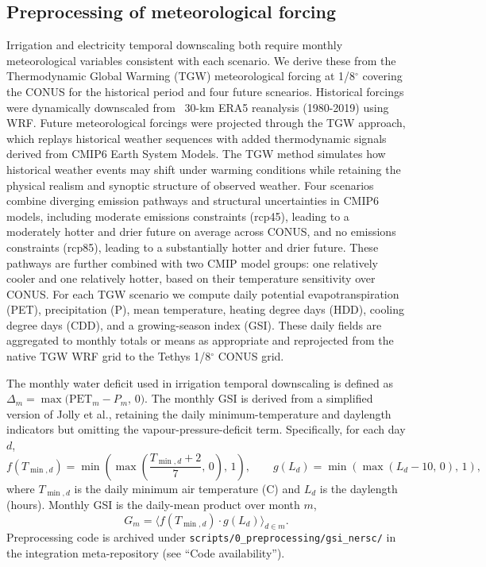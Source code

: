 \documentclass[fleqn,10pt]{wlscirep}
\begin{document}
\subsection*{Preprocessing of meteorological forcing}

Irrigation and electricity temporal downscaling both require monthly meteorological variables consistent with each scenario. We derive these from the Thermodynamic Global Warming (TGW) meteorological forcing \cite{Jones2023TGW}at 1/8$^{\circ}$ covering the CONUS for the historical period and four future scnearios. Historical forcings were dynamically downscaled from ~30-km ERA5 reanalysis (1980-2019) using WRF. Future meteorological forcings were projected through the TGW approach, which replays historical weather sequences with added thermodynamic signals derived from CMIP6 Earth System Models. The TGW method simulates how historical weather events may shift under warming conditions while retaining the physical realism and synoptic structure of observed weather. Four scenarios combine diverging emission pathways and structural uncertainties in CMIP6 models, including moderate emissions constraints (rcp45), leading to a moderately hotter and drier future on average across CONUS, and no emissions constraints (rcp85), leading to a substantially hotter and drier future. These pathways are further combined with two CMIP model groups: one relatively cooler and one relatively hotter, based on their temperature sensitivity over CONUS. For each TGW scenario we compute daily potential evapotranspiration (PET), precipitation (P), mean temperature, heating degree days (HDD), cooling degree days (CDD), and a growing-season index (GSI). These daily fields are aggregated to monthly totals or means as appropriate and reprojected from the native TGW WRF grid to the Tethys 1/8$^{\circ}$ CONUS grid.

The monthly water deficit used in irrigation temporal downscaling is defined as $\Delta_m = \max\!\big(\text{PET}_m - P_m,\, 0\big)$. The monthly GSI is derived from a simplified version of Jolly et al.\cite{Jolly_2005}, retaining the daily minimum-temperature and daylength indicators but omitting the vapour-pressure-deficit term. Specifically, for each day $d$,
\begin{equation}
f(T_{\min,d}) = \min\!\left(\max\!\left(\frac{T_{\min,d}+2}{7},\,0\right),\,1\right), \qquad
g(L_d) = \min\!\left(\max\!\left(L_d - 10,\,0\right),\,1\right),
\label{eq:gsi-components}
\end{equation}
where $T_{\min,d}$ is the daily minimum air temperature (\textdegree C) and $L_d$ is the daylength (hours). Monthly GSI is the daily-mean product over month $m$,
\begin{equation}
G_m = \big\langle f(T_{\min,d}) \cdot g(L_d) \big\rangle_{d \in m}.
\label{eq:gsi-monthly}
\end{equation}
Preprocessing code is archived under \texttt{scripts/0\_preprocessing/gsi\_nersc/} in the integration meta-repository (see ``Code availability'').
\end{document}
